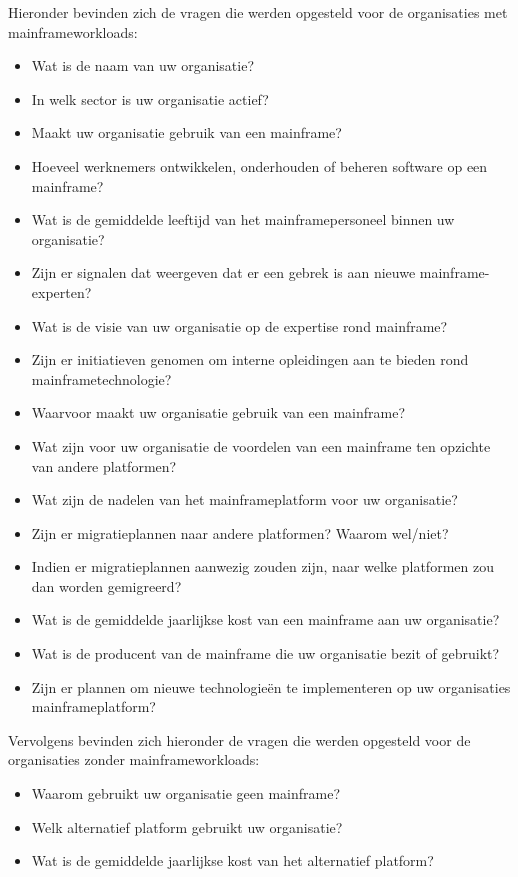 Hieronder bevinden zich de vragen die werden opgesteld voor de organisaties met mainframeworkloads:
 \begin{itemize}
    \item Wat is de naam van uw organisatie?
    \item In welk sector is uw organisatie actief?
    \item Maakt uw organisatie gebruik van een mainframe?
    \item Hoeveel werknemers ontwikkelen, onderhouden of beheren software op een mainframe?
    \item Wat is de gemiddelde leeftijd van het mainframepersoneel binnen uw organisatie?
    \item Zijn er signalen dat weergeven dat er een gebrek is aan nieuwe mainframe-experten?
    \item Wat is de visie van uw organisatie op de expertise rond mainframe?
    \item Zijn er initiatieven genomen om interne opleidingen aan te bieden rond mainframetechnologie?
    \item Waarvoor maakt uw organisatie gebruik van een mainframe?
    \item Wat zijn voor uw organisatie de voordelen van een mainframe ten opzichte van andere platformen?
    \item Wat zijn de nadelen van het mainframeplatform voor uw organisatie?
    \item Zijn er migratieplannen naar andere platformen? Waarom wel/niet?
    \item Indien er migratieplannen aanwezig zouden zijn, naar welke platformen zou dan worden gemigreerd?
    \item Wat is de gemiddelde jaarlijkse kost van een mainframe aan uw organisatie?
    \item Wat is de producent van de mainframe die uw organisatie bezit of gebruikt?
    \item Zijn er plannen om nieuwe technologieën te implementeren op uw organisaties mainframeplatform?
\end{itemize}

\newpage

Vervolgens bevinden zich hieronder de vragen die werden opgesteld voor de organisaties zonder mainframeworkloads:
 \begin{itemize}
    \item Waarom gebruikt uw organisatie geen mainframe?
    \item Welk alternatief platform gebruikt uw organisatie?
    \item Wat is de gemiddelde jaarlijkse kost van het alternatief platform?
\end{itemize}

